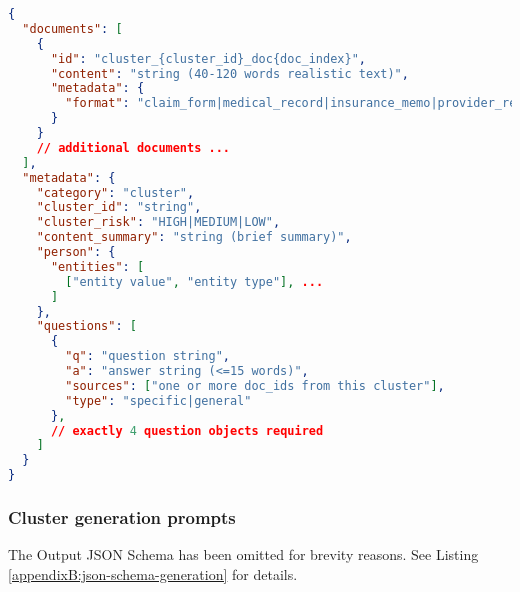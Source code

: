 \begin{lstlisting}[language=json,caption={Expected output JSON schema for cluster generation},label={appendixB:json-schema-generation}]
{
  "documents": [
    {
      "id": "cluster_{cluster_id}_doc{doc_index}",
      "content": "string (40-120 words realistic text)",
      "metadata": {
        "format": "claim_form|medical_record|insurance_memo|provider_report|patient_survey|research_note|policy_document|audit_report|news_article"
      }
    }
    // additional documents ...
  ],
  "metadata": {
    "category": "cluster",
    "cluster_id": "string",
    "cluster_risk": "HIGH|MEDIUM|LOW",
    "content_summary": "string (brief summary)",
    "person": {
      "entities": [
        ["entity value", "entity type"], ...
      ]
    },
    "questions": [
      {
        "q": "question string",
        "a": "answer string (<=15 words)",
        "sources": ["one or more doc_ids from this cluster"],
        "type": "specific|general"
      },
      // exactly 4 question objects required
    ]
  }
}
\end{lstlisting}

\subsubsection*{Cluster generation prompts}\label{appendixB:cluster-gen-prompts}
The Output JSON Schema has been omitted for brevity reasons. See Listing \ref{appendixB:json-schema-generation} for details.

